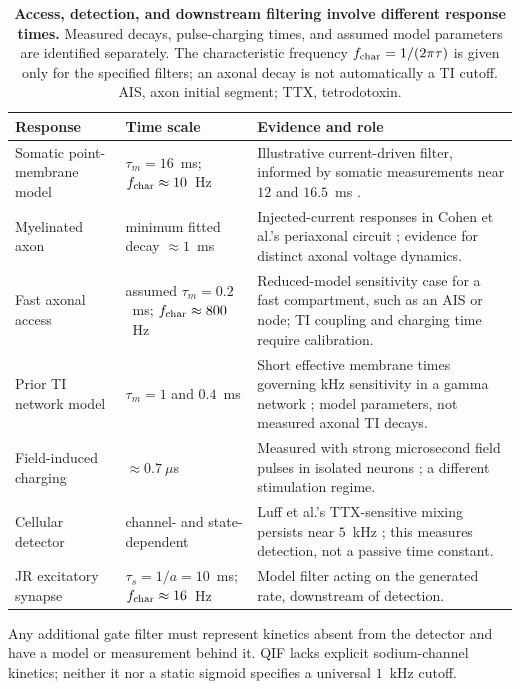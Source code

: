 \documentclass[a4paper]{article}
\begin{document}
\begin{table}[t!]
\centering\small
\renewcommand{\arraystretch}{1.15}
\begin{tabular}{@{}>{\raggedright\arraybackslash}p{2.8cm}
>{\raggedright\arraybackslash}p{3.5cm}
>{\raggedright\arraybackslash}p{8.6cm}@{}}
\toprule
Response & Time scale & Evidence and role \\
\midrule
Somatic point-membrane model & $\tau_m=16$~ms; $f_{\rm char}\approx10$~Hz &
Illustrative current-driven filter, informed by somatic measurements near $12$ and $16.5$~ms
\cite{deitcher2017,eyal2016}. \\
Myelinated axon & minimum fitted decay $\approx1$~ms &
Injected-current responses in Cohen et al.'s periaxonal circuit
\cite{cohen2020periaxonal}; evidence for distinct axonal voltage dynamics. \\
Fast axonal access & assumed $\tau_m=0.2$~ms; $f_{\rm char}\approx800$~Hz &
Reduced-model sensitivity case for a fast compartment, such as an AIS or node;
TI coupling and charging time require calibration. \\
Prior TI network model & $\tau_m=1$ and $0.4$~ms &
Short effective membrane times governing kHz sensitivity in a gamma network
\cite{esmaeilpour2021}; model parameters, not measured axonal TI decays. \\
Field-induced charging & $\approx0.7~\mu$s &
Measured with strong microsecond field pulses in isolated neurons
\cite{semenov2025}; a different stimulation regime. \\
Cellular detector & channel- and state-dependent &
Luff et al.'s TTX-sensitive mixing persists near $5$~kHz
\cite{luff2024mixer}; this measures detection, not a passive time constant. \\
JR excitatory synapse & $\tau_s=1/a=10$~ms; $f_{\rm char}\approx16$~Hz &
Model filter acting on the generated rate, downstream of detection. \\
\bottomrule
\end{tabular}
\caption{\textbf{Access, detection, and downstream filtering involve different response
times.} Measured decays, pulse-charging times, and assumed model parameters are
identified separately. The characteristic frequency $f_{\rm char}=1/(2\pi\tau)$
is given only for the specified filters; an axonal decay is not automatically a TI
cutoff. AIS, axon initial segment; TTX, tetrodotoxin.}
\label{tab:doors}
\end{table}

Any additional gate filter must represent kinetics absent from the detector
and have a model or measurement behind it. QIF lacks explicit sodium-channel
kinetics; neither it nor a static sigmoid specifies a universal $1$~kHz cutoff.
\end{document}

